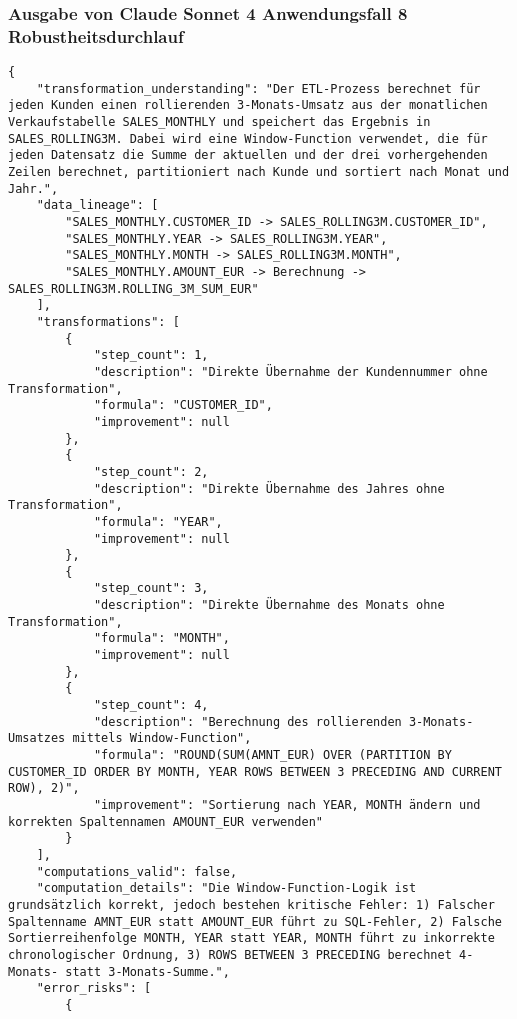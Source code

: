 \subsubsection{Ausgabe von Claude Sonnet 4 Anwendungsfall 8 Robustheitsdurchlauf}\label{anhang:subsubsec:claude_case8_prompt3}
\begin{lstlisting}[caption={Ausgabe: Claude Sonnet 4 Anwendungsfall 8 Robustheitsdurchlauf},label={claude_case8_prompt3}]
{
    "transformation_understanding": "Der ETL-Prozess berechnet für jeden Kunden einen rollierenden 3-Monats-Umsatz aus der monatlichen Verkaufstabelle SALES_MONTHLY und speichert das Ergebnis in SALES_ROLLING3M. Dabei wird eine Window-Function verwendet, die für jeden Datensatz die Summe der aktuellen und der drei vorhergehenden Zeilen berechnet, partitioniert nach Kunde und sortiert nach Monat und Jahr.",
    "data_lineage": [
        "SALES_MONTHLY.CUSTOMER_ID -> SALES_ROLLING3M.CUSTOMER_ID",
        "SALES_MONTHLY.YEAR -> SALES_ROLLING3M.YEAR",
        "SALES_MONTHLY.MONTH -> SALES_ROLLING3M.MONTH",
        "SALES_MONTHLY.AMOUNT_EUR -> Berechnung -> SALES_ROLLING3M.ROLLING_3M_SUM_EUR"
    ],
    "transformations": [
        {
            "step_count": 1,
            "description": "Direkte Übernahme der Kundennummer ohne Transformation",
            "formula": "CUSTOMER_ID",
            "improvement": null
        },
        {
            "step_count": 2,
            "description": "Direkte Übernahme des Jahres ohne Transformation",
            "formula": "YEAR",
            "improvement": null
        },
        {
            "step_count": 3,
            "description": "Direkte Übernahme des Monats ohne Transformation",
            "formula": "MONTH",
            "improvement": null
        },
        {
            "step_count": 4,
            "description": "Berechnung des rollierenden 3-Monats-Umsatzes mittels Window-Function",
            "formula": "ROUND(SUM(AMNT_EUR) OVER (PARTITION BY CUSTOMER_ID ORDER BY MONTH, YEAR ROWS BETWEEN 3 PRECEDING AND CURRENT ROW), 2)",
            "improvement": "Sortierung nach YEAR, MONTH ändern und korrekten Spaltennamen AMOUNT_EUR verwenden"
        }
    ],
    "computations_valid": false,
    "computation_details": "Die Window-Function-Logik ist grundsätzlich korrekt, jedoch bestehen kritische Fehler: 1) Falscher Spaltenname AMNT_EUR statt AMOUNT_EUR führt zu SQL-Fehler, 2) Falsche Sortierreihenfolge MONTH, YEAR statt YEAR, MONTH führt zu inkorrekte chronologischer Ordnung, 3) ROWS BETWEEN 3 PRECEDING berechnet 4-Monats- statt 3-Monats-Summe.",
    "error_risks": [
        {

\end{lstlisting}
